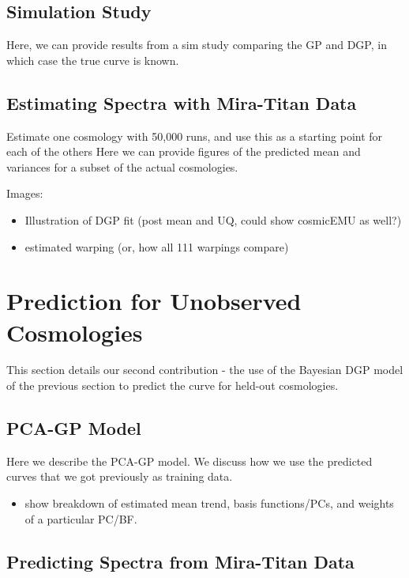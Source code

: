\documentclass[11pt]{article}
\begin{document}
\subsection{Simulation Study}
\label{subsec:sim}

Here, we can provide results from a sim study comparing the GP and DGP, in which case the true curve is known.

\subsection{Estimating Spectra with Mira-Titan Data}
\label{subsec:mira_fit}

Estimate one cosmology with 50,000 runs, and use this as a starting point for each of the others
Here we can provide figures of the predicted mean and variances for a subset of the actual cosmologies.

Images:
\begin{itemize}
    \item Illustration of DGP fit (post mean and UQ, could show cosmicEMU as well?)
    \item estimated warping (or, how all 111 warpings compare)
\end{itemize}


\section{Prediction for Unobserved Cosmologies}
\label{sec:pred}

This section details our second contribution - the use of the Bayesian DGP model of the previous section to predict the curve for held-out cosmologies.

\subsection{PCA-GP Model}
\label{subsec:pca}

Here we describe the PCA-GP model.  We discuss how we use the predicted curves that we got previously as training data.

\begin{itemize}
    \item show breakdown of estimated mean trend, basis functions/PCs, and weights of a particular PC/BF.
\end{itemize}

\subsection{Predicting Spectra from Mira-Titan Data}
\label{subsec:mira_pred}
\end{document}
